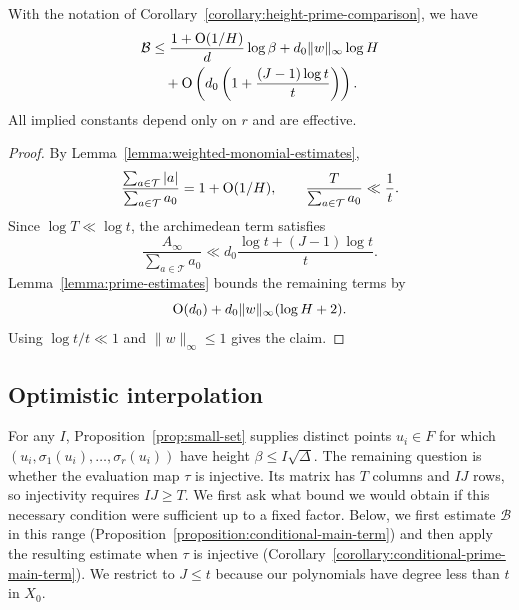 \documentclass[reqno]{amsart} 
\begin{document}
\begin{lemma}\label{lemma:parameter-bound}
  With the notation of Corollary~\ref{corollary:height-prime-comparison}, we have
  \begin{equation}\label{eq:parameter-bound}
    \begin{split}
      \mathcal{B}
      &\leq \frac{1 + \operatorname{O}(1/H)}{d}\log\beta
        + d_0\lVert w \rVert_\infty\log H \\
      &\quad + \operatorname{O} \left(d_0\left(1 + \frac{(J-1)\log t}{t}\right)\right).
    \end{split}
  \end{equation}
  All implied constants depend only on $r$ and are effective.
\end{lemma}
\begin{proof}
  By Lemma~\ref{lemma:weighted-monomial-estimates},
  \begin{equation*}
    \frac{\sum_{a \in \mathcal{T}}|a|}{\sum_{a \in \mathcal{T}}a_0}
    = 1 + \operatorname{O}(1/H),\qquad
    \frac{T}{\sum_{a \in \mathcal{T}}a_0} \ll \frac1t.
  \end{equation*}
  Since $\log T \ll \log t$, the archimedean term satisfies
  \begin{equation*}
    \frac{A_\infty}{\sum_{a \in \mathcal{T}}a_0}
    \ll d_0\frac{\log t + (J-1)\log t}{t}.
  \end{equation*}
  Lemma~\ref{lemma:prime-estimates} bounds the remaining terms by
  \begin{equation*}
    \operatorname{O}(d_0) + d_0\lVert w \rVert_\infty(\log H + 2).
  \end{equation*}
  Using $\log t/t \ll 1$ and $\lVert w \rVert_\infty \leq 1$ gives the claim.
\end{proof}

\subsection{Optimistic interpolation}\label{sec:cus71nhhdz}

For any $I$, Proposition~\ref{prop:small-set} supplies distinct points $u_i\in F$ for which $(u_i,\sigma_1(u_i),\dotsc,\sigma_r(u_i))$ have height $\beta\leq I\sqrt\Delta$.  The remaining question is whether the evaluation map $\tau$ is injective.  Its matrix has $T$ columns and $IJ$ rows, so injectivity requires $IJ\geq T$.  We first ask what bound we would obtain if this necessary condition were sufficient up to a fixed factor.  Below, we first estimate $\mathcal{B}$ in this range (Proposition~\ref{proposition:conditional-main-term}) and then apply the resulting estimate when $\tau$ is injective (Corollary~\ref{corollary:conditional-prime-main-term}).  We restrict to $J \leq t$ because our polynomials have degree less than $t$ in $X_0$.
\end{document}
